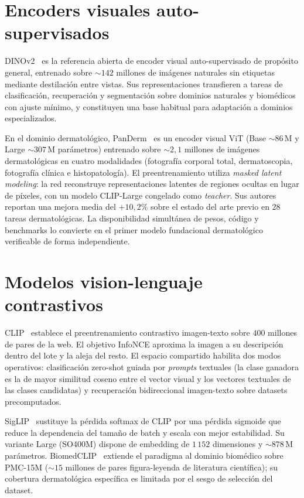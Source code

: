 \section{Encoders visuales auto-supervisados}
\label{sec:encoders-visuales}

DINOv2~\cite{dinov2} es la referencia abierta de encoder visual
auto-supervisado de propósito general, entrenado sobre
$\sim 142$ millones de imágenes naturales sin etiquetas mediante
destilación entre vistas. Sus representaciones transfieren a tareas
de clasificación, recuperación y segmentación sobre dominios
naturales y biomédicos con ajuste mínimo, y constituyen una base
habitual para adaptación a dominios especializados.

En el dominio dermatológico, PanDerm~\cite{panderm2025} es un
encoder visual ViT (Base $\sim 86$\,M y Large $\sim 307$\,M
parámetros) entrenado sobre $\sim 2{,}1$ millones de imágenes
dermatológicas en cuatro modalidades (fotografía corporal total,
dermatoscopia, fotografía clínica e histopatología). El
preentrenamiento utiliza \emph{masked latent modeling}: la red
reconstruye representaciones latentes de regiones ocultas en lugar
de píxeles, con un modelo CLIP-Large congelado como
\emph{teacher}. Sus autores reportan una mejora media del
$+10{,}2\%$ sobre el estado del arte previo en $28$ tareas
dermatológicas. La disponibilidad simultánea de pesos, código y
benchmarks lo convierte en el primer modelo fundacional dermatológico
verificable de forma independiente.

\section{Modelos vision-lenguaje contrastivos}
\label{sec:vision-lenguaje}

CLIP~\cite{clip2021} establece el preentrenamiento contrastivo
imagen-texto sobre $400$ millones de pares de la web. El objetivo
InfoNCE aproxima la imagen a su descripción dentro del lote y la
aleja del resto. El espacio compartido habilita dos modos
operativos: clasificación zero-shot guiada por \emph{prompts}
textuales (la clase ganadora es la de mayor similitud coseno entre
el vector visual y los vectores textuales de las clases candidatas)
y recuperación bidireccional imagen-texto sobre datasets
precomputados.

SigLIP~\cite{siglip2023} sustituye la pérdida softmax de CLIP por
una pérdida sigmoide que reduce la dependencia del tamaño de batch y
escala con mejor estabilidad. Su variante Large
(SO400M) dispone de embedding de $1\,152$ dimensiones y
$\sim 878$\,M parámetros. BiomedCLIP~\cite{biomedclip} extiende
el paradigma al dominio biomédico sobre PMC-15M
($\sim 15$ millones de pares figura-leyenda de literatura
científica); su cobertura dermatológica específica es limitada por
el sesgo de selección del dataset.

